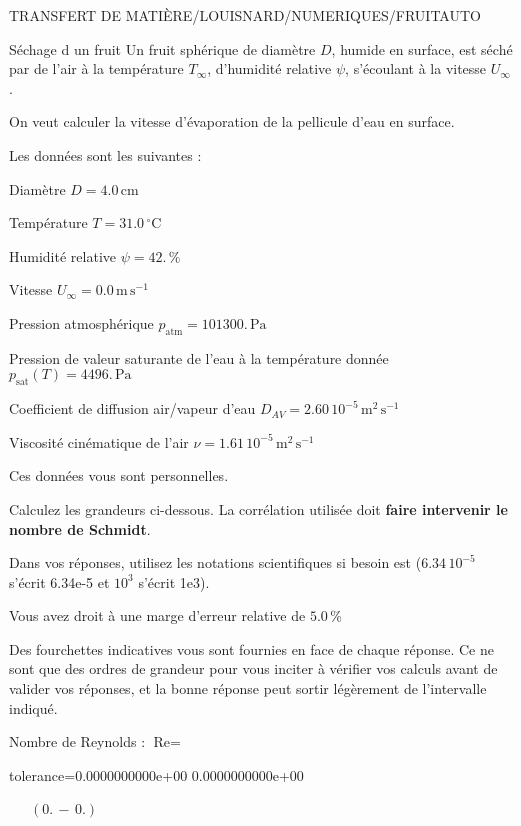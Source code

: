 \documentclass[12pt]{article}
\begin{document}
\begin{quiz}{TRANSFERT DE MATIÈRE/LOUISNARD/NUMERIQUES/FRUITAUTO} 

 \begin{cloze}{Séchage d un fruit} 
Un fruit sphérique de diamètre $D$, humide en surface, est séché par de l'air à la température $T_\infty$, d'humidité relative $\psi$, s'écoulant à la vitesse $U_\infty$.

On veut calculer la vitesse d'évaporation de la pellicule d'eau en surface.

 

Les données sont les suivantes :

 

Diamètre $D = 4.0\,  \mathrm{cm} $

Température $T = 31.0\,  \mathrm{^\circ\mathrm{C}} $

Humidité relative $\psi = 42.\, \% $

Vitesse $U_\infty = 0.0\,  \mathrm{m}\,  \mathrm{s}^{-1} $

Pression atmosphérique $p_{\text{atm}} = 101300.\,  \mathrm{Pa} $

Pression de valeur saturante de l’eau à la température donnée $p_{\text{sat}}(T) = 4496.\,  \mathrm{Pa} $

Coefficient de diffusion air/vapeur d’eau $D_{AV} =  2.60 \, 10^{-5} \,  \mathrm{m}^{2}\,  \mathrm{s}^{-1} $

Viscosité cinématique de l’air $\nu =  1.61 \, 10^{-5} \,  \mathrm{m}^{2}\,  \mathrm{s}^{-1} $

Ces données vous sont personnelles.

 

Calculez les grandeurs ci-dessous. La corrélation utilisée doit \textbf{faire intervenir le nombre de Schmidt}.

Dans vos réponses, utilisez les notations scientifiques si besoin est ($6.34\, 10^{-5}$ s'écrit 6.34e-5 et $10^{3}$ s'écrit 1e3).

Vous avez droit à une marge d'erreur relative de $5.0\, \% $

Des fourchettes indicatives vous sont fournies en face de chaque réponse. Ce ne sont que des ordres de grandeur pour vous inciter à vérifier vos calculs avant de valider vos réponses, et la bonne réponse peut sortir légèrement de l'intervalle indiqué.

 

Nombre de Reynolds : $\text{Re} =  $
\begin{numerical}[points=1] 
\item[tolerance={0.0000000000e+00}] 0.0000000000e+00 
\end{numerical} 
 $\,$ 
 $ \quad (0. \, - \, 0.) $ 


\end{cloze}
\end{quiz}
\end{document}
